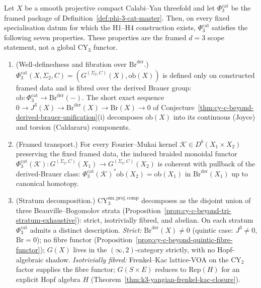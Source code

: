 \begin{theorem}
\label{thm:phi-3-cat-master-synthesis}
Let $X$ be a smooth projective compact Calabi--Yau threefold and let
$\Phi_3^{\mathrm{cat}}$ be the framed package of
Definition~\ref{def:phi-3-cat-master}. Then, on every fixed specialisation datum
for which the H1--H4 construction exists, $\Phi_3^{\mathrm{cat}}$
satisfies the following seven properties. These properties are the
framed $d = 3$ scope statement, not a global CY$_3$ functor.
\begin{enumerate}[label=\textup{(\Roman*)}]
 \item \textup{(Well-definedness and fibration over $\mathrm{Br}^{\mathrm{der}}$.)}
 $\Phi_3^{\mathrm{cat}}(X,\Sigma_2,C) = (G^{(\Sigma_2,C)}(X), \mathrm{ob}(X))$ is defined only on
 constructed framed data and is fibred
 over the derived Brauer group:
 $\mathrm{ob} : \Phi_3^{\mathrm{cat}} \to \mathrm{Br}^{\mathrm{der}}(-)$.
 The short exact sequence
 $0 \to J^3(X) \to \mathrm{Br}^{\mathrm{der}}(X) \to \mathrm{Br}(X) \to 0$
 of
 Conjecture~\ref{thm:cy-c-beyond-derived-brauer-unification}\textup{(i)}
 decomposes $\mathrm{ob}(X)$ into its continuous (Joyce) and torsion
 (Caldararu) components.
 \item \textup{(Framed transport.)} For every Fourier--Mukai kernel
 $\mathcal K \in D^b(X_1 \times X_2)$ preserving the fixed framed data, the induced braided monoidal
 functor $\Phi_3^{\mathrm{cat}}(\mathcal K) : G^{(\Sigma_2,C)}(X_1) \to G^{(\Sigma_2,C)}(X_2)$ is
 coherent with pullback of the derived-Brauer class:
 $\Phi_3^{\mathrm{cat}}(\mathcal K)^* \mathrm{ob}(X_2)
 = \mathrm{ob}(X_1)$ in $\mathrm{Br}^{\mathrm{der}}(X_1)$ up to
 canonical homotopy.
 \item \textup{(Stratum decomposition.)}
 $\mathrm{CY}_3^{\mathrm{sm,proj,comp}}$ decomposes as the disjoint
 union of three Beauville--Bogomolov strata
 (Proposition~\ref{prop:cy-c-beyond-tri-stratum-exhaustive}): strict,
 isotrivially fibred, and abelian. On each stratum
 $\Phi_3^{\mathrm{cat}}$ admits a distinct description. \emph{Strict:}
 $\mathrm{Br}^{\mathrm{der}}(X) \neq 0$ (quintic case:
 $J^3 \neq 0$, $\mathrm{Br} = 0$); no fibre functor
 (Proposition~\ref{prop:cy-c-beyond-quintic-fibre-functor}); $G(X)$
 lives in the $(\infty,2)$-category strictly, with no Hopf-algebraic
 shadow. \emph{Isotrivially fibred:} Frenkel--Kac lattice-VOA on the
 CY$_2$ factor supplies the fibre functor; $G(S \times E)$ reduces to
 $\mathrm{Rep}(H)$ for an explicit Hopf algebra $H$
 (Theorem~\ref{thm:k3-yangian-frenkel-kac-closure}).

\end{enumerate}
\end{theorem}
